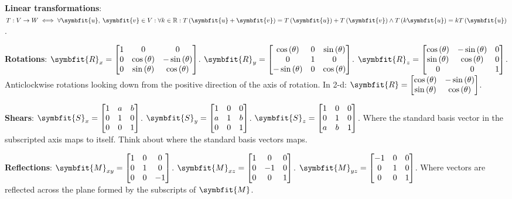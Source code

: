 \documentclass{article}
\begin{document}
\noindent \textbf{Linear transformations}: $T:V\rightarrow W \iff \forall \symbfit{u},\: \symbfit{v} \in V:\forall k \in \mathbb{R}:\func{T}{\symbfit{u}+\symbfit{v}}=\func{T}{\symbfit{u}} + \func{T}{\symbfit{v}} \wedge \func{T}{k\symbfit{u}} = k\func{T}{\symbfit{u}}$. 

\noindent \textbf{Rotations}: $\symbfit{R}_x=\mqty[1 & 0 & 0 \\ 0 & \cos{\left( \theta \right)} & -\sin{\left( \theta \right)} \\ 0 & \sin{\left( \theta \right)} & \cos{\left( \theta \right)}]$. $\symbfit{R}_y=\mqty[\cos{\left( \theta \right)} & 0 & \sin{\left( \theta \right)} \\ 0 & 1 & 0 \\ -\sin{\left( \theta \right)} & 0 & \cos{\left( \theta \right)}]$. $\symbfit{R}_z=\mqty[\cos{\left( \theta \right)} & -\sin{\left( \theta \right)} & 0 \\ \sin{\left( \theta \right)} & \cos{\left( \theta \right)} & 0 \\ 0 & 0 & 1]$. Anticlockwise rotations looking down from the positive direction of the axis of rotation.
In 2-d: $\symbfit{R}=\mqty[\cos{\left( \theta \right)} & -\sin{\left( \theta \right)} \\ \sin{\left( \theta \right)} & \cos{\left( \theta \right)}]$.
		
\noindent \textbf{Shears}: $\symbfit{S}_x=\mqty[1 & a & b \\ 0 & 1 & 0 \\ 0 & 0 & 1]$. $\symbfit{S}_y=\mqty[1 & 0 & 0 \\ a & 1 & b \\ 0 & 0 & 1]$. $\symbfit{S}_z=\mqty[1 & 0 & 0 \\ 0 & 1 & 0 \\ a & b & 1]$. Where the standard basis vector in the subscripted axis maps to itself. Think about where the standard basis vectors maps.

\noindent \textbf{Reflections}: $\symbfit{M}_{xy}=\mqty[1 & 0 & 0 \\ 0 & 1 & 0 \\ 0 & 0 & -1]$. $\symbfit{M}_{xz}=\mqty[1 & 0 & 0 \\ 0 & -1 & 0 \\ 0 & 0 & 1]$. $\symbfit{M}_{yz}=\mqty[-1 & 0 & 0 \\ 0 & 1 & 0 \\ 0 & 0 & 1]$. Where vectors are reflected across the plane formed by the subscripts of $\symbfit{M}$.
\end{document}
